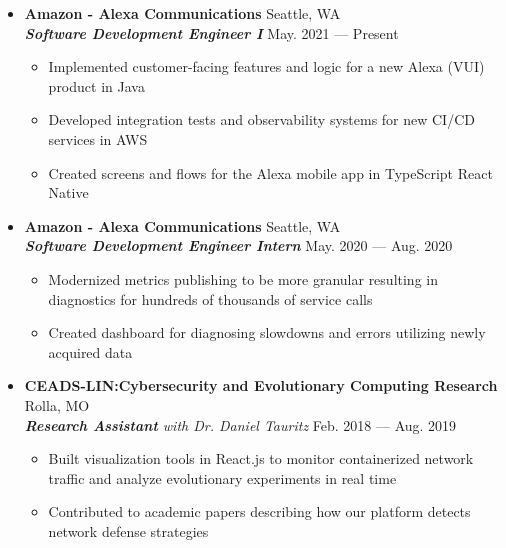 \documentclass[9pt,oneside]{memoir}
\begin{document}
\begin{itemize}
      \item[] \textbf{Amazon - Alexa Communications}
            \hfill Seattle, WA\\
            \textit{\textbf{Software Development Engineer I}}
            \hfill May. 2021 --- Present
            \begin{itemize}
                  \item[\textbullet] Implemented customer-facing features and logic for a new Alexa (VUI) product in Java
                  \item[\textbullet] Developed integration tests and observability systems for new CI/CD services in AWS
                  \item[\textbullet] Created screens and flows for the Alexa mobile app in TypeScript React Native
            \end{itemize}
      
      \item[] \textbf{Amazon - Alexa Communications}
            \hfill Seattle, WA\\
            \textit{\textbf{Software Development Engineer Intern}}
            \hfill May. 2020 --- Aug. 2020
            \begin{itemize}
                  \item[\textbullet] Modernized metrics publishing to be more granular resulting
                        in diagnostics for hundreds of thousands of service calls
                  \item[\textbullet] Created dashboard for diagnosing slowdowns and errors utilizing
                        newly acquired data
            \end{itemize}

      \item[] \textbf{CEADS-LIN:\@ Cybersecurity and Evolutionary Computing Research}
            \hfill Rolla, MO\\
            \textit{\textbf{Research Assistant} with Dr. Daniel Tauritz}
            \hfill Feb. 2018 --- Aug. 2019
            \begin{itemize}
                  \item[\textbullet] Built visualization tools in React.js to
                        monitor containerized network traffic and analyze evolutionary experiments
                        in real time
                  \item[\textbullet] Contributed to academic papers describing how our
                        platform detects network defense strategies
            \end{itemize}


\end{itemize}
\end{document}
